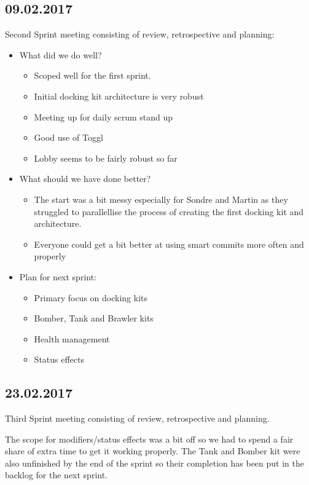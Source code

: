 \subsection*{09.02.2017}
Second Sprint meeting consisting of review, retrospective and planning:
\begin{itemize}
    \item What did we do well?
    \begin{itemize}
        \item Scoped well for the first sprint.
        \item Initial docking kit architecture is very robust
        \item Meeting up for daily scrum stand up
        \item Good use of Toggl
        \item Lobby seems to be fairly robust so far
    \end{itemize}
    
    \item What should we have done better?
    \begin{itemize}
        \item The start was a bit messy especially for Sondre and Martin as they struggled to parallellise the process of creating the first docking kit and architecture.
        \item Everyone could get a bit better at using smart commits more often and properly
    \end{itemize}
    
    \item Plan for next sprint:
    \begin{itemize}
        \item Primary focus on docking kits
        \item Bomber, Tank and Brawler kits
        \item Health management
        \item Status effects
    \end{itemize}
\end{itemize}

\subsection*{23.02.2017}
Third Sprint meeting consisting of review, retrospective and planning.

The scope for modifiers/status effects was a bit off so we had to spend a fair share of extra time to get it working properly. The Tank and Bomber kit were also unfinished by the end of the sprint so their completion has been put in the backlog for the next sprint.

